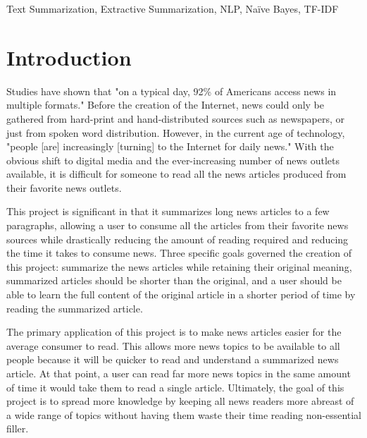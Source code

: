 \documentclass{IEEEtran}
\begin{document}
{\begin{abstract}
    \end{abstract}
    \begin{IEEEkeywords}
    Text Summarization, Extractive Summarization, NLP, Na\"{i}ve Bayes, TF-IDF 
    \end{IEEEkeywords}
}

\maketitle
\IEEEdisplaynontitleabstractindextext


\section{Introduction}
Studies have shown that "on a typical day, 92\% of Americans access news in multiple formats." \cite{news_reading_behavior} Before the creation of the Internet, news could only be gathered from hard-print and hand-distributed sources such as newspapers, or just from spoken word distribution. However, in the current age of technology, "people [are] increasingly [turning] to the Internet for daily news." \cite{news_reading_behavior} With the obvious shift to digital media and the ever-increasing number of news outlets available, it is difficult for someone to read all the news articles produced from their favorite news outlets.

This project is significant in that it summarizes long news articles to a few paragraphs, allowing a user to consume all the articles from their favorite news sources while drastically reducing the amount of reading required and reducing the time it takes to consume news. Three specific goals governed the creation of this project: summarize the news articles while retaining their original meaning, summarized articles should be shorter than the original, and a user should be able to learn the full content of the original article in a shorter period of time by reading the summarized article.

The primary application of this project is to make news articles easier for the average consumer to read. This allows more news topics to be available to all people because it will be quicker to read and understand a summarized news article. At that point, a user can read far more news topics in the same amount of time it would take them to read a single article. Ultimately, the goal of this project is to spread more knowledge by keeping all news readers more abreast of a wide range of topics without having them waste their time reading non-essential filler.
\end{document}
